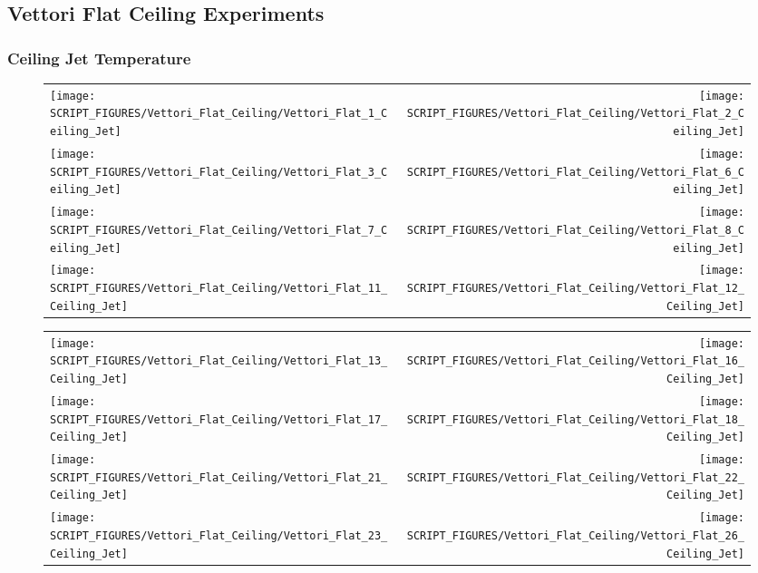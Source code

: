 \clearpage

\subsection{Vettori Flat Ceiling Experiments}

\subsubsection{Ceiling Jet Temperature}

\begin{figure}[!ht]
\begin{tabular*}{\textwidth}{l@{\extracolsep{\fill}}r}
\texttt{[image: SCRIPT\_FIGURES/Vettori\_Flat\_Ceiling/Vettori\_Flat\_1\_Ceiling\_Jet]} &
\texttt{[image: SCRIPT\_FIGURES/Vettori\_Flat\_Ceiling/Vettori\_Flat\_2\_Ceiling\_Jet]} \\
\texttt{[image: SCRIPT\_FIGURES/Vettori\_Flat\_Ceiling/Vettori\_Flat\_3\_Ceiling\_Jet]} &
\texttt{[image: SCRIPT\_FIGURES/Vettori\_Flat\_Ceiling/Vettori\_Flat\_6\_Ceiling\_Jet]} \\
\texttt{[image: SCRIPT\_FIGURES/Vettori\_Flat\_Ceiling/Vettori\_Flat\_7\_Ceiling\_Jet]} &
\texttt{[image: SCRIPT\_FIGURES/Vettori\_Flat\_Ceiling/Vettori\_Flat\_8\_Ceiling\_Jet]} \\
\texttt{[image: SCRIPT\_FIGURES/Vettori\_Flat\_Ceiling/Vettori\_Flat\_11\_Ceiling\_Jet]} &
\texttt{[image: SCRIPT\_FIGURES/Vettori\_Flat\_Ceiling/Vettori\_Flat\_12\_Ceiling\_Jet]}
\end{tabular*}
\end{figure}

\begin{figure}[!ht]
\begin{tabular*}{\textwidth}{l@{\extracolsep{\fill}}r}
\texttt{[image: SCRIPT\_FIGURES/Vettori\_Flat\_Ceiling/Vettori\_Flat\_13\_Ceiling\_Jet]} &
\texttt{[image: SCRIPT\_FIGURES/Vettori\_Flat\_Ceiling/Vettori\_Flat\_16\_Ceiling\_Jet]} \\
\texttt{[image: SCRIPT\_FIGURES/Vettori\_Flat\_Ceiling/Vettori\_Flat\_17\_Ceiling\_Jet]} &
\texttt{[image: SCRIPT\_FIGURES/Vettori\_Flat\_Ceiling/Vettori\_Flat\_18\_Ceiling\_Jet]} \\
\texttt{[image: SCRIPT\_FIGURES/Vettori\_Flat\_Ceiling/Vettori\_Flat\_21\_Ceiling\_Jet]} &
\texttt{[image: SCRIPT\_FIGURES/Vettori\_Flat\_Ceiling/Vettori\_Flat\_22\_Ceiling\_Jet]} \\
\texttt{[image: SCRIPT\_FIGURES/Vettori\_Flat\_Ceiling/Vettori\_Flat\_23\_Ceiling\_Jet]} &
\texttt{[image: SCRIPT\_FIGURES/Vettori\_Flat\_Ceiling/Vettori\_Flat\_26\_Ceiling\_Jet]}
\end{tabular*}
\end{figure}

